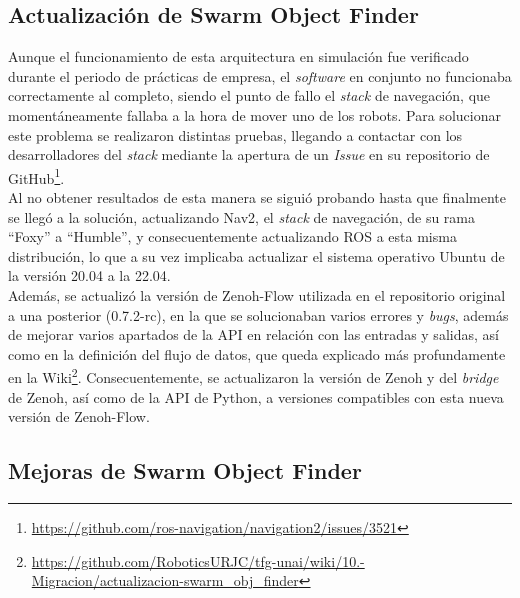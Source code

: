 \subsection{Actualización de Swarm Object Finder}
\label{sec:actualizacion_swarm_obj_finder}

Aunque el funcionamiento de esta arquitectura en simulación fue verificado
durante el periodo de prácticas de empresa, el \textit{software} en conjunto no
funcionaba correctamente al completo, siendo el punto de fallo el \textit{stack}
de navegación, que momentáneamente fallaba a la hora de mover uno de los robots.
Para solucionar este problema se realizaron distintas pruebas, llegando a
contactar con los desarrolladores del \textit{stack} mediante la apertura de un
\textit{Issue} en su repositorio de GitHub\footnote{
\href{https://github.com/ros-navigation/navigation2/issues/3521}{https://github.com/ros-navigation/navigation2/issues/3521}}.
\\

Al no obtener resultados de esta manera se siguió probando hasta que finalmente
se llegó a la solución, actualizando Nav2, el \textit{stack} de navegación, de
su rama ``Foxy'' a ``Humble'', y consecuentemente actualizando ROS a esta misma
distribución, lo que a su vez implicaba actualizar el sistema operativo Ubuntu
de la versión 20.04 a la 22.04.
\\

Además, se actualizó la versión de Zenoh-Flow utilizada en el repositorio
original a una posterior (0.7.2-rc), en la que se solucionaban varios errores y
\textit{bugs}, además de mejorar varios apartados de la API en relación con las
entradas y salidas, así como en la definición del flujo de datos, que queda
explicado más profundamente en la Wiki\footnote{
\href{https://github.com/RoboticsURJC/tfg-unai/wiki/10.-Migraci\%C3\%B3n-de-swarm\_obj\_finder-a-la-nueva-version-de-Zenoh\%E2\%80\%90flow-\%5B20-Ago-\%E2\%80\%90-30-Sep\%5D\#actualizaci\%C3\%B3n-de-swarm\_obj\_finder-a-la-nueva-versi\%C3\%B3n-de-zenoh-flow}{https://github.com/RoboticsURJC/tfg-unai/wiki/10.-Migracion/actualizacion-swarm\_obj\_finder}}.
Consecuentemente, se actualizaron la versión de Zenoh y del \textit{bridge} de
Zenoh, así como de la API de Python, a versiones compatibles con esta nueva
versión de Zenoh-Flow.
\\

\subsection{Mejoras de Swarm Object Finder}
\label{sec:mejoras_swarm_obj_finder}

